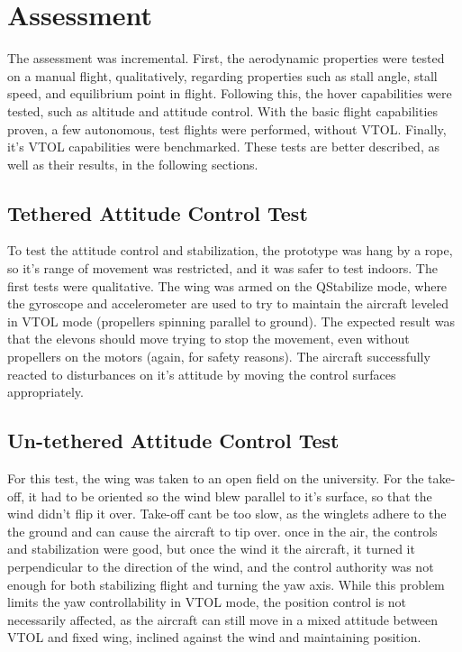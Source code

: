 \chapter{Assessment} \label{chap:assessment}

The assessment was incremental. First, the aerodynamic properties were tested on a manual flight, qualitatively, regarding properties such as stall angle, stall speed, and equilibrium point in flight. Following this, the hover capabilities were tested, such as altitude and attitude control. With the basic flight capabilities proven, a few autonomous, test flights were performed, without VTOL. Finally, it's VTOL capabilities were benchmarked. These tests are better described, as well as their results, in the following sections.


\section{Tethered Attitude Control Test}

To test the attitude control and stabilization, the prototype was hang by a rope, so it's range of movement was restricted, and it was safer to test indoors.
%
The first tests were qualitative. The wing was armed on the QStabilize mode, where the gyroscope and accelerometer are used to try to maintain the aircraft leveled in VTOL mode (propellers spinning parallel to ground).
%
The expected result was that the elevons should move trying to stop the movement, even without propellers on the motors (again, for safety reasons).
%
The aircraft successfully reacted to disturbances on it's attitude by moving the control surfaces appropriately.


\section{Un-tethered Attitude Control Test} 

For this test, the wing was taken to an open field on the university.
%
For the take-off, it had to be oriented so the wind blew parallel to it's surface, so that the wind didn't flip it over.
%
Take-off cant be too slow, as the winglets adhere to the the ground and can cause the aircraft to tip over.
%
once in the air, the controls and stabilization were good, but once the wind it the aircraft, it turned it perpendicular to the direction of the wind, and the control authority was not enough for both stabilizing flight and turning the yaw axis.
%
While this problem limits the yaw controllability in VTOL mode, the position control is not necessarily affected, as the aircraft can still move in a mixed attitude between VTOL and fixed wing, inclined against the wind and maintaining position.
%


